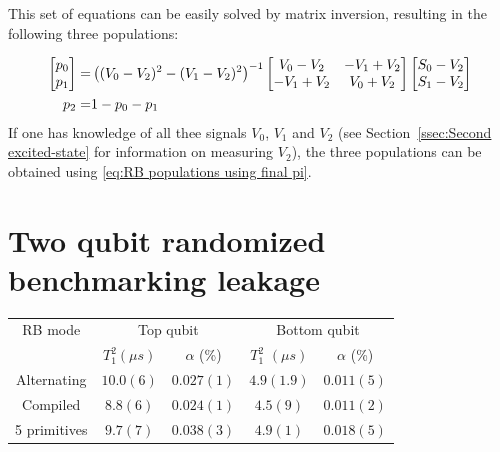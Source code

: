       This set of equations can be easily solved by matrix inversion, resulting in the following three populations:

      \begin{align}
        \begin{bmatrix}
          p_0 \\
          p_1
        \end{bmatrix}
        = &
        \left((V_0-V_2)^2 - (V_1 - V_2)^2\right)^{-1}
        \begin{bmatrix}
          V_0 - V_2 & -V_1 + V_2 \\
          -V_1 + V_2 & V_0 + V_2
        \end{bmatrix}
        \begin{bmatrix}
          S_0 - V_2 \\
          S_1 - V_2
        \end{bmatrix} \notag\\
        p_2 = & 1 - p_0 - p_1
        \label{eq:RB populations using final pi}
      \end{align}
      If one has knowledge of all thee signals $V_0$, $V_1$ and $V_2$ (see Section~\ref{ssec:Second excited-state} for information on measuring $V_2$), the three populations can be obtained using \ref{eq:RB populations using final pi}.
      \newpage
  \section{Two qubit randomized benchmarking leakage}
    \label{sec:Two qubit randomized benchmarking leakage}
        \begin{table}[h]
          \begin{tabular}{c c c c c}
            \toprule
            RB mode & \multicolumn{2}{c}{Top qubit} & \multicolumn{2}{c}{Bottom qubit} \\
            \cmidrule(lr){2-3}
            \cmidrule(lr){4-5}
            & $T_1^2 (\mu s)$ & $\alpha$ (\%) & $T_1^2$ $(\mu s)$ & $\alpha$ (\%) \\
            \midrule
            Alternating  & $10.0(6)$    & $0.027(1)$ & $4.9(1.9)$  & $0.011(5)$\\
            Compiled     & $8.8(6)$    & $0.024(1)$  & $4.5(9)$ & $0.011(2)$\\
            5 primitives &$9.7(7)$    & $0.038(3)$  & $4.9(1)$  & $0.018(5)$\\
            \bottomrule
          \end{tabular}
        \end{table}


